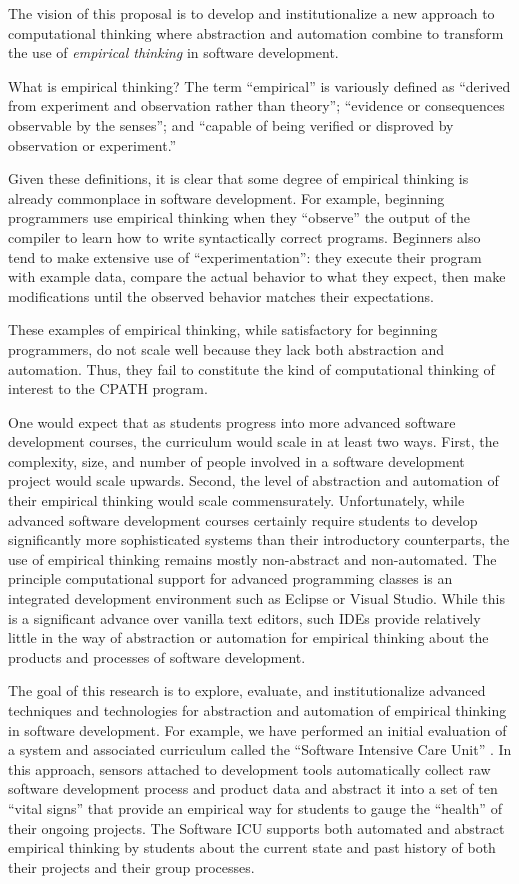 The vision of this proposal is to develop and institutionalize a new
approach to computational thinking where abstraction and automation combine
to transform the use of {\em empirical thinking} in software development.

What is empirical thinking?  The term ``empirical'' is variously defined as
``derived from experiment and observation rather than theory''; ``evidence
or consequences observable by the senses''; and ``capable of being verified
or disproved by observation or experiment.''

Given these definitions, it is clear that some degree of empirical thinking
is already commonplace in software development.  For example, beginning
programmers use empirical thinking when they ``observe'' the output of the
compiler to learn how to write syntactically correct programs.  Beginners
also tend to make extensive use of ``experimentation'': they execute their
program with example data, compare the actual behavior to what they expect,
then make modifications until the observed behavior matches their
expectations.

These examples of empirical thinking, while satisfactory for beginning
programmers, do not scale well because they lack both abstraction and
automation. Thus, they fail to constitute the kind of computational
thinking of interest to the CPATH program.

One would expect that as students progress into more advanced software
development courses, the curriculum would scale in at least two
ways. First, the complexity, size, and number of people involved in a software
development project would scale upwards.  Second, the level of abstraction
and automation of their empirical thinking would scale
commensurately. Unfortunately, while advanced software development courses
certainly require students to develop significantly more sophisticated
systems than their introductory counterparts, the use of empirical
thinking remains mostly non-abstract and non-automated.  The principle
computational support for advanced programming classes is an integrated
development environment such as Eclipse or Visual Studio. While this is a
significant advance over vanilla text editors, such IDEs provide relatively
little in the way of abstraction or automation for empirical thinking about
the products and processes of software development.

The goal of this research is to explore, evaluate, and institutionalize advanced techniques and technologies for abstraction and automation of empirical thinking in software development.  For example, we have performed an initial evaluation of a system and associated curriculum called the ``Software Intensive Care Unit'' \citep{csdl2-09-02}.  In this approach, sensors attached to development tools automatically collect raw software development process and product data and abstract it into a set of ten ``vital signs'' that provide an empirical way for students to gauge the ``health'' of their ongoing projects.  The Software ICU supports both automated and abstract empirical thinking by students about the current state and past history of both their projects and their group processes.

